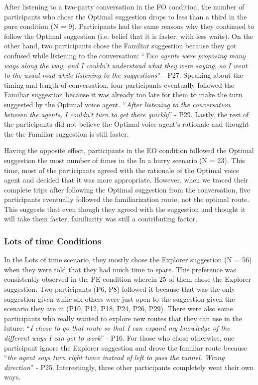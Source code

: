 After listening to a two-party conversation in the FO condition, the number of participants who chose the Optimal suggestion drops to less than a third in the pure condition (N = 9). Participants had the same reasons why they continued to follow the Optimal suggestion (i.e. belief that it is faster, with less waits). On the other hand, two participants chose the Familiar suggestion because they got confused while listening to the conversation: ``\textit{Two agents were proposing many ways along the way, and I couldn't understand what they were saying, so I went to the usual road while listening to the suggestions}'' - P27. Speaking about the timing and length of conversation, four participants eventually followed the Familiar suggestion because it was already too late for them to make the turn suggested by the Optimal voice agent. ``\textit{After listening to the conversation between the agents, I couldn't turn to get there quickly}'' - P29. Lastly, the rest of the participants did not believe the Optimal voice agent's rationale and thought the the Familiar suggestion is still faster.

Having the opposite effect, participants in the EO condition followed the Optimal suggestion the most number of times in the In a hurry scenario (N = 23). This time, most of the participants agreed with the rationale of the Optimal voice agent and decided that it was more appropriate. However, when we traced their complete trips after following the Optimal suggestion from the conversation, five participants eventually followed the familiarization route, not the optimal route. This suggests that even though they agreed with the suggestion and thought it will take them faster, familiarity was still a contributing factor. 

\subsubsection{Lots of time Conditions}
In the Lots of time scenario, they mostly chose the Explorer suggestion (N = 56) when they were told that they had much time to spare. This preference was consistently observed in the PE condition wherein 25 of them chose the Explorer suggestion. Two participants (P6, P8) followed it because that was the only suggestion given while six others were just open to the suggestion given the scenario they are in (P10, P12, P18, P24, P26, P29). There were also some participants who really wanted to explore new routes that they can use in the future: ``\textit{I chose to go that route so that I can expand my knowledge of the different ways I can get to work}'' - P16. For those who chose otherwise, one participant ignore the Explorer suggestion and drove the familiar route because ``\textit{the agent says turn right twice instead of left to pass the tunnel. Wrong direction}'' - P25. Interestingly, three other participants completely went their own ways.


